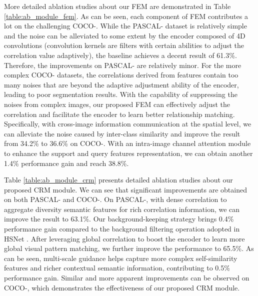 \documentclass[journal]{IEEEtran}
\begin{document}
 {More detailed ablation studies about our FEM are demonstrated in Table \ref{table:ab_module_fem}. As can be seen, each component of FEM contributes a lot on the challenging COCO-. While the PASCAL- dataset is relatively simple and the noise can be alleviated to some extent by the encoder composed of 4D convolutions (convolution kernels are filters with certain abilities to adjust the correlation value adaptively), the baseline achieves a decent result of 61.3\%. Therefore, the improvements on PASCAL- are relatively minor. For the more complex COCO- datasets, the correlations derived from features contain too many noises that are beyond the adaptive adjustment ability of the encoder, leading to poor segmentation results. With the capability of suppressing the noises from complex images, our proposed FEM can effectively adjust the correlation and facilitate the encoder to learn better relationship matching. Specifically, with cross-image information communication at the spatial level, we can alleviate the noise caused by inter-class similarity and improve the result from 34.2\% to 36.6\% on COCO-. With an intra-image channel attention module to enhance the support and query features representation, we can obtain another 1.4\% performance gain and reach 38.8\%. 
	
Table \ref{table:ab_module_crm} presents detailed ablation studies about our proposed CRM module. We can see that significant improvements are obtained on both PASCAL- and COCO-. On PASCAL-, with dense correlation to aggregate diversity semantic features for rich correlation information, we can improve the result to 63.1\%. Our background-keeping strategy brings 0.4\% performance gain compared to the background filtering operation adopted in  HSNet \cite{min2021hypercorrelation}. After leveraging global correlation to boost the encoder to learn more global visual pattern matching, we further improve the performance to 65.5\%. As can be seen, multi-scale guidance helps capture more complex self-similarity features and richer contextual semantic information, contributing to 0.5\% performance gain. Similar and more apparent improvements can be observed on COCO-, which demonstrates the effectiveness of our proposed CRM module.
}
\end{document}
